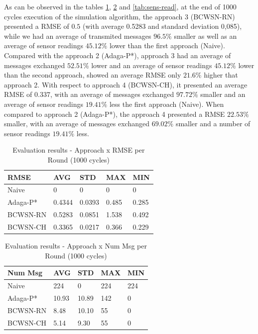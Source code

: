 \documentclass[conference]{IEEEtran}
\begin{document}
As can be observed in the tables \ref{tab:rmse}, \ref{tab:num-msg} and
\ref{tab:sens-read}, at the end of 1000 cycles execution of the simulation
algorithm, the approach 3 (BCWSN-RN) presented a RMSE of $0.5$ (with average
0.5283 and standard deviation 0,085), while we had an average of transmited
messages $96.5\%$ smaller as well as an average of sensor readings $45.12\%$
lower than the first approach (Naive). Compared with the approach 2 (Adaga-P*),
approach 3 had an average of messages exchanged $52.51\%$ lower and an average
of sensor readings $45.12\%$ lower than the second approach, showed an average
RMSE only $21.6\%$ higher that approach 2.
With respect to approach 4 (BCWSN-CH), it presented an average RMSE of $0.337$,
with an average of messages exchanged $97.72\%$ smaller and an average of sensor
readings $19.41\%$ less the first approach (Naive). When compared to approach 2
(Adaga-P*), the approach 4 presented a RMSE $22.53\%$ smaller, with an average
of messages exchanged $69.02\%$ smaller and a number of sensor readings
$19.41\%$ less.

\begin{table}[h!]
\caption{Evaluation results - Approach x RMSE per Round (1000 cycles)}
\label{tab:rmse}
\begin{center}
\begin{tabular}{|l||l|l|l|l|}
\hline
RMSE &AVG &STD &MAX &MIN \\
\hline\hline
Naive &0 &0 &0 &0 \\
\hline
Adaga-P* &0.4344 &0.0393 &0.485 &0.285 \\
\hline
BCWSN-RN &0.5283 &0.0851 &1.538 &0.492 \\
\hline
BCWSN-CH &0.3365 &0.0217 &0.366 &0.229 \\
\hline
\end{tabular}
\end{center}
\end{table}

\begin{table}[h!]
\caption{Evaluation results - Approach x Num Msg per Round (1000 cycles)}
\label{tab:num-msg}
\begin{center}
\begin{tabular}{|l||l|l|l|l|}
\hline
Num Msg &AVG &STD &MAX &MIN \\
\hline\hline
Naive &224 &0 &224 &224 \\
\hline
Adaga-P* &10.93 &10.89 &142 &0 \\
\hline
BCWSN-RN &8.48 &10.10 &55 &0 \\
\hline
BCWSN-CH &5.14 &9.30 &55 &0 \\
\hline
\end{tabular}
\end{center}
\end{table}
\end{document}
